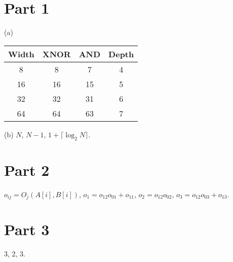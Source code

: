 \documentclass{article}
\begin{document}
\section{Part 1}

(a)
  
\begin{center}
  
\begin{tabular}{cccc}
 \toprule
    Width&XNOR&AND&Depth\\
\midrule
  8&8&7&4\\
  16&16&15&5\\
  32&32&31&6\\
  64&64&63&7\\
\bottomrule
  \end{tabular}
\end{center}

(b) $N$, $N-1$, $1+\lceil\log_2N\rceil$.

\section{Part 2}

$o_{ij}=O_j(A[i], B[i])$, $o_1=o_{12}o_{01}+o_{11}$, $o_2=o_{12}o_{02}$, $o_3=o_{12}o_{03}+o_{13}$.

\section{Part 3}

3, 2, 3.
\end{document}
